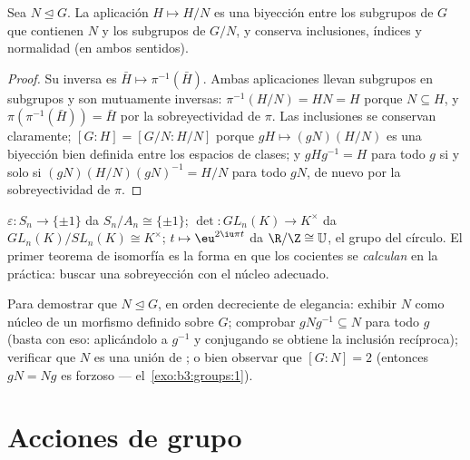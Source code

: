 \begin{theorem}\label{thm:b3:groups:correspondence}
Sea $N \trianglelefteq G$. La aplicación $H \mapsto H/N$ es una
biyección entre los subgrupos de $G$ que contienen $N$ y los subgrupos
de $G/N$, y conserva inclusiones, índices y normalidad (en ambos
sentidos).
\end{theorem}

\begin{proof}
Su inversa es $\bar H \mapsto \pi^{-1}(\bar H)$. Ambas aplicaciones
llevan subgrupos en subgrupos y son mutuamente inversas:
$\pi^{-1}(H/N) =
HN = H$ porque $N \subseteq H$, y $\pi(\pi^{-1}(\bar H)) = \bar H$ por
la sobreyectividad de $\pi$. Las inclusiones se conservan claramente;
$[G:H] = [G/N : H/N]$ porque $gH \mapsto (gN)(H/N)$ es una biyección
bien definida entre los espacios de clases; y $gHg^{-1} = H$ para todo
$g$ si y solo si $(gN)(H/N)(gN)^{-1} = H/N$ para todo $gN$, de nuevo por
la sobreyectividad de $\pi$.
\end{proof}

\begin{example}\label{ex:b3:groups:firstiso}
$\varepsilon \colon S_n \to \{\pm 1\}$ da $S_n/A_n \cong
\{\pm1\}$; $\det \colon GL_n(K) \to K^\times$ da
$GL_n(K)/SL_n(K) \cong K^\times$; $t \mapsto \eu^{2\iu\pi t}$ da
$\R/\Z \cong \mathbb U$, el grupo del círculo. El primer teorema de
isomorfía es la forma en que los cocientes se \emph{calculan} en la
práctica: buscar una sobreyección con el núcleo adecuado.
\end{example}

\begin{method}\label{met:b3:groups:normal}
Para demostrar que $N \trianglelefteq G$, en orden decreciente de
elegancia: exhibir $N$ como núcleo de un morfismo definido sobre $G$;
comprobar $gNg^{-1} \subseteq N$ para todo $g$ (basta con eso:
aplicándolo a $g^{-1}$ y conjugando se obtiene la inclusión recíproca);
verificar que $N$ es una unión de ; o bien observar que $[G:N] = 2$ (entonces $gN = Ng$ es
forzoso --- el~\cref{exo:b3:groups:1}).
\end{method}

\section{Acciones de grupo}

